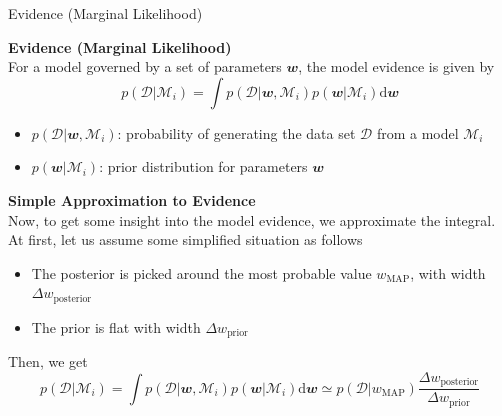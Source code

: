 \documentclass{bredelebeamer}
\begin{document}
\begin{frame}{Evidence (Marginal Likelihood)}
  \begin{justify}
    \textbf{Evidence (Marginal Likelihood)} \\
    For a model governed by a set of parameters $\mathbfit{w}$, the model
    evidence is given by
    \begin{equation}
      p(\mathcal{D}|\mathcal{M}_i)
      = \int
        p(\mathcal{D}|\mathbfit{w}, \mathcal{M}_i)
        p(\mathbfit{w}|\mathcal{M}_i)
      \mathrm{d}\mathbfit{w}
    \end{equation}
    \begin{itemize}
      \item $p(\mathcal{D}|\mathbfit{w}, \mathcal{M}_i)$:
      probability of generating the data set $\mathcal{D}$ from a model $\mathcal{M}_i$
      \item $p(\mathbfit{w}|\mathcal{M}_i)$:
      prior distribution for parameters $\mathbfit{w}$
    \end{itemize}

    \vspace{0.5\baselineskip}
    \textbf{Simple Approximation to Evidence} \\
    Now, to get some insight into the model evidence, we approximate the integral.
    At first, let us assume some simplified situation as follows
    \begin{itemize}
      \item The posterior is picked around the most probable value $w_{\textrm{MAP}}$,
      with width $\Delta w_{\textrm{posterior}}$
      \item The prior is flat with width $\Delta w_{\textrm{prior}}$
    \end{itemize}

    Then, we get
    \begin{equation}
      p(\mathcal{D}|\mathcal{M}_i)
      = \int
        p(\mathcal{D}|\mathbfit{w}, \mathcal{M}_i)
        p(\mathbfit{w}|\mathcal{M}_i)
      \mathrm{d}\mathbfit{w}
      \simeq
      p(\mathcal{D}|w_{\textrm{MAP}}) \frac{\Delta w_{\textrm{posterior}}}{\Delta w_{\textrm{prior}}}
    \end{equation}

  \end{justify}
\end{frame}
\end{document}
